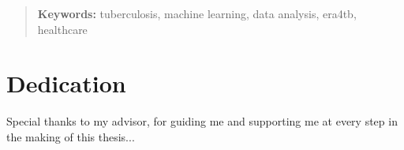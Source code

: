 \documentclass[../main.tex]{subfiles}
\begin{document}
\renewcommand\abstractname{\large\uppercase{Abstract}}
\begin{abstract}
\thispagestyle{plain}
\setcounter{page}{3}
	



\textbf{Keywords:}
tuberculosis, machine learning, data analysis, era4tb, healthcare
	
	\vfill
\end{abstract}
\newpage %
\thispagestyle{empty}
\mbox{}


\chapter*{Dedication}

\setcounter{page}{5}
	

Special thanks to my advisor, for guiding me and supporting me at every step in the making of this thesis...




	
\vfill
\newpage %
\thispagestyle{empty}
\mbox{}

	
\end{document}
